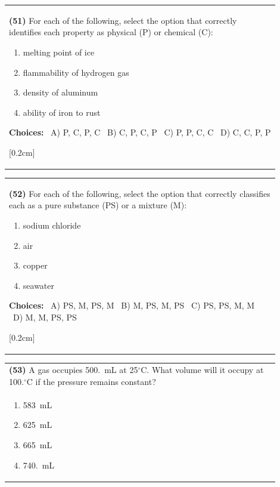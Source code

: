 \documentclass{article}
\begin{document}
\noindent\begin{tabular}{|p{0.9\linewidth}|}
\hline
\textbf{(51)} For each of the following, select the option that correctly identifies each property as physical (P) or chemical (C): \
\begin{minipage}[t]{0.85\linewidth}
\begin{enumerate}[label=\alph*.]
\item melting point of ice
\item flammability of hydrogen gas
\item density of aluminum
\item ability of iron to rust
\end{enumerate}
\textbf{Choices:} \
A) P, C, P, C \
B) C, P, C, P \
C) P, P, C, C \
D) C, C, P, P
\end{minipage}[0.2cm]
\hline
\end{tabular}

\noindent\begin{tabular}{|p{0.9\linewidth}|}
\hline
\textbf{(52)} For each of the following, select the option that correctly classifies each as a pure substance (PS) or a mixture (M): \
\begin{minipage}[t]{0.85\linewidth}
\begin{enumerate}[label=\alph*.]
\item sodium chloride
\item air
\item copper
\item seawater
\end{enumerate}
\textbf{Choices:} \
A) PS, M, PS, M \
B) M, PS, M, PS \
C) PS, PS, M, M \
D) M, M, PS, PS
\end{minipage}[0.2cm]
\hline
\end{tabular}

\noindent\begin{tabular}{|p{0.9\linewidth}|}
\hline
\textbf{(53)} A gas occupies 500.~mL at 25$^\circ$C. What volume will it occupy at 100.$^\circ$C if the pressure remains constant? \\[0.2cm]

\begin{minipage}[t]{0.85\linewidth}
\begin{enumerate}[label=\alph*.]
\item 583~mL
\item 625~mL
\item 665~mL
\item 740.~mL
\end{enumerate}
\end{minipage}\\[0.2cm]
\hline
\end{tabular}
\end{document}
